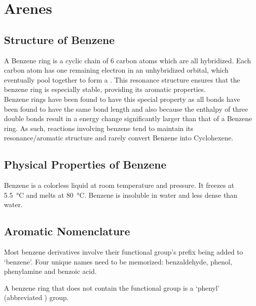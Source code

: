 \documentclass[../main]{subfiles}
\begin{document}
\section{Arenes}

	\subsection{Structure of Benzene}

	A Benzene ring is a cyclic chain of 6 carbon atoms which are all  hybridized. Each carbon atom has one remaining electron in an unhybridized  orbital, which eventually pool together to form a . This resonance structure ensures that the benzene ring is especially stable, providing its aromatic properties. \\

	Benzene rings have been found to have this special property as all  bonds have been found to have the same bond length and also because the enthalpy of three  double bonds result in a energy change significantly larger than that of a Benzene ring. As such, reactions involving benzene tend to maintain its resonance/aromatic structure and rarely convert Benzene into Cyclohexene.

	\subsection{Physical Properties of Benzene}

	Benzene is a colorless liquid at room temperature and pressure. It freezes at \SI{5.5}{\celsius} and melts at \SI{80}{\celsius}. Benzene is insoluble in water and less dense than water.

	\subsection{Aromatic Nomenclature}

	Most benzene derivatives involve their functional group's prefix being added to `benzene'. Four unique names need to be memorized: benzaldehyde, phenol, phenylamine and benzoic acid.

	\begin{center}
	\end{center}

	A benzene ring that does not contain the functional group is a `phenyl' (abbreviated ) group.
\end{document}
